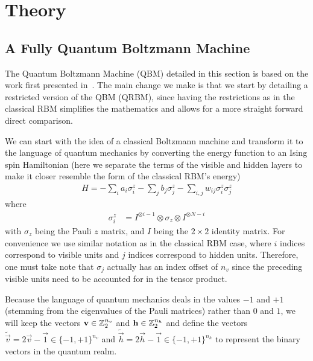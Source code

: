 \section{Theory}
\subsection{A Fully Quantum Boltzmann Machine}
The Quantum Boltzmann Machine (QBM) detailed in this section is based on the work first presented in~\cite{amin_2018}.
The main change we make is that we start by detailing a restricted version of the QBM (QRBM), since having the restrictions as in the classical RBM simplifies the mathematics and allows for a more straight forward direct comparison.

We can start with the idea of a classical Boltzmann machine and transform it to the language of quantum mechanics by converting the energy function to an Ising spin Hamiltonian (here we separate the terms of the visible and hidden layers to make it closer resemble the form of the classical RBM's energy)
\begin{align}
    H = -\sum_i a_i \sigma_i^z - \sum_j b_j \sigma_j^z - \sum_{i,j} w_{ij} \sigma_i^z \sigma_j^z
\end{align}
where
\begin{align}
    \sigma_i^z
        &= I^{\otimes i-1} \otimes \sigma_z \otimes I^{\otimes N-i}
\end{align}
with \( \sigma_z \) being the Pauli \( z \) matrix, and \( I \) being the \( 2 \times 2 \) identity matrix.
For convenience we use similar notation as in the classical RBM case, where \( i \) indices correspond to visible units and \( j \) indices correspond to hidden units.
Therefore, one must take note that \( \sigma_j \) actually has an index offset of \( n_v \) since the preceding visible units need to be accounted for in the tensor product.

Because the language of quantum mechanics deals in the values \( -1 \) and \( +1 \) (stemming from the eigenvalues of the Pauli matrices) rather than \( 0 \) and \( 1 \), we will keep the vectors \( \mathbf{v} \in \mathbb{Z}_2^{n_v} \) and \( \mathbf{h} \in \mathbb{Z}_2^{n_h} \) and define the vectors \( \tilde{\vec{v}} = 2\vec{v} - \vec{1} \in \{-1,+1\}^{n_v} \) and \( \tilde{\vec{h}} = 2\vec{h} - \vec{1} \in \{-1,+1\}^{n_h} \) to represent the binary vectors in the quantum realm.

